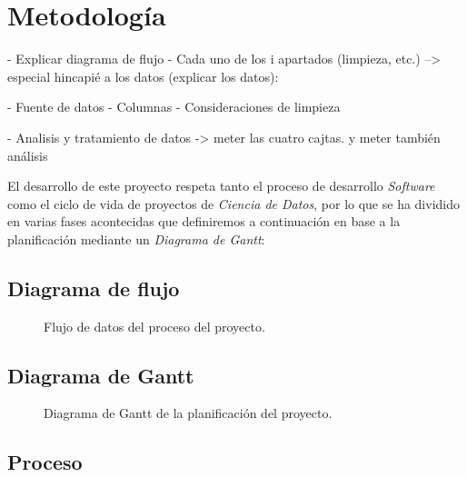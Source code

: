 
\chapter{Metodología}
\label{metodologia}

    - Explicar diagrama de flujo
        - Cada uno de los i apartados (limpieza, etc.) --> especial hincapié a los datos (explicar los datos): 

            - Fuente de datos
            - Columnas
            - Consideraciones de limpieza

            - Analisis y tratamiento de datos -> meter las cuatro cajtas. y meter también análisis

El desarrollo de este proyecto respeta tanto el proceso de desarrollo \textit{Software} como el ciclo de vida de proyectos de \textit{Ciencia de Datos}, por lo que se ha dividido en varias fases acontecidas que definiremos a continuación en base a la planificación mediante un \textit{Diagrama de Gantt}:


\section{Diagrama de flujo}


    \begin{figure}[h]
        \centering
        
        \caption{Flujo de datos del proceso del proyecto.}
        \label{DataflowImage}
    \end{figure}

\section{Diagrama de Gantt}

    \begin{figure}[h]
        \centering
        
        \caption{Diagrama de Gantt de la planificación del proyecto.}
        \label{GranttImage}
    \end{figure}

\section{Proceso}

